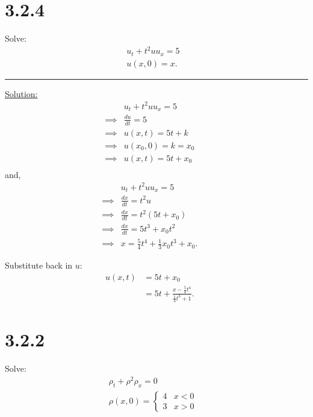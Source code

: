 \documentclass{article}
\begin{document}
\newpage
\section*{3.2.4}

Solve:
\begin{align*}
  &u_t + t^2uu_x = 5 &&\\
  &u(x,0) = x.
\end{align*}

\begin{center}
  \noindent\rule{8cm}{0.4pt}
\end{center}

\underline{Solution:}
\begin{align*}
  &u_t + t^2uu_x = 5 &&\\
  \implies& \frac{du}{dt} = 5 &&\\
  \implies& u(x,t) = 5t + k &&\\
  \implies& u(x_0,0) = k = x_0 &&\\
  \implies& u(x,t) = 5t + x_0 &&\\
\end{align*}
and,
\begin{align*}
  &u_t + t^2uu_x = 5 &&\\
  \implies&\frac{dx}{dt} = t^2u &&\\
  \implies&\frac{dx}{dt} = t^2 (5t + x_0) &&\\
  \implies&\frac{dx}{dt} = 5t^3 + x_0t^2 &&\\
  \implies&x = \frac{5}{4} t^4 + \frac{1}{3}x_0t^3 + x_0.
\end{align*}

Substitute back in $u$:
\begin{align*}
  u(x,t) &= 5t + x_0 &&\\
  &= 5t + \frac{x-\frac{5}{4}t^4}{\frac{1}{3}t^3 + 1}.
\end{align*}

\newpage

\section*{3.2.2}
Solve:
\begin{align*}
  &\rho_t + \rho^2 \rho_x = 0 &&\\
  &\rho(x,0) = \begin{cases}
    4 & x < 0 \\
    3 & x > 0
  \end{cases}
\end{align*}
\end{document}
